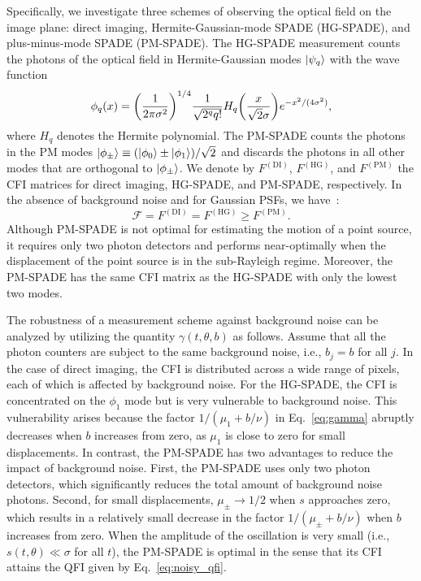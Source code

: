 \documentclass[aps,pra,10pt,showpacs,amsmath,amssymb,floatfix,superscriptaddress,twocolumn]{revtex4-2}
\begin{document}
Specifically, we investigate three schemes of observing the optical field on the image plane: direct imaging, Hermite-Gaussian-mode SPADE (HG-SPADE), and plus-minus-mode SPADE (PM-SPADE).
The HG-SPADE measurement counts the photons of the optical field in Hermite-Gaussian modes \(\ket{\psi_q}\) with the wave function
\begin{equation}
  \phi_q(x) = \qty(\frac1{2\pi\sigma^2})^{1/4}\frac1{\sqrt{2^qq!}}H_q\qty(\frac x{\sqrt2\sigma})e^{-x^2/(4\sigma^2)},
\end{equation}
where $H_q$ denotes the Hermite polynomial. 
The PM-SPADE counts the photons in the PM modes \( \ket{\phi_\pm} \equiv (\ket{\phi_0} \pm \ket{\phi_1}) / \sqrt2\) and discards the photons in all other modes that are orthogonal to \(\ket{\phi_\pm}\).
We denote by \( F^\mathrm{(DI)} \), \( F^\mathrm{(HG)} \), and \( F^\mathrm{(PM)} \) the CFI matrices for direct imaging, HG-SPADE, and PM-SPADE, respectively.
In the absence of background noise and for Gaussian PSFs, we have~\cite{SupplementalMaterial}:
\begin{equation}
  \mathcal{F} = F^\mathrm{(DI)} = F^\mathrm{(HG)} \geq F^\mathrm{(PM)}.
\end{equation}
Although PM-SPADE is not optimal for estimating the motion of a point source, it requires only two photon detectors and performs near-optimally when the displacement of the point source is in the sub-Rayleigh regime.
Moreover, the PM-SPADE has the same CFI matrix as the HG-SPADE with only the lowest two modes.


The robustness of a measurement scheme against background noise can be analyzed by utilizing the quantity \( \gamma(t,\theta,b) \) as follows.  
Assume that all the photon counters are subject to the same background noise, i.e., \( b_j = b \) for all \( j \).
In the case of direct imaging, the CFI is distributed across a wide range of pixels, each of which is affected by background noise.
For the HG-SPADE, the CFI is concentrated on the \(\phi_1\) mode but is very vulnerable to background noise.
This vulnerability arises because the factor \(1/(\mu_1+b/\nu)\) in Eq.~\eqref{eq:gamma} abruptly decreases when \(b\) increases from zero, as \(\mu_1\) is close to zero for small displacements.
In contrast, the PM-SPADE has two advantages to reduce the impact of background noise.
First, the PM-SPADE uses only two photon detectors, which significantly reduces the total amount of background noise photons.
Second, for small displacements, \(\mu_\pm \to 1/2\) when \(s\) approaches zero, which results in a relatively small decrease in the factor \(1/(\mu_\pm+b/\nu)\) when \(b\) increases from zero.
When the amplitude of the oscillation is very small (i.e., \(s(t, \theta) \ll \sigma\) for all \(t\)), the PM-SPADE is  optimal in the sense that its CFI attains the QFI given by Eq.~\eqref{eq:noisy_qfi}.
\end{document}
